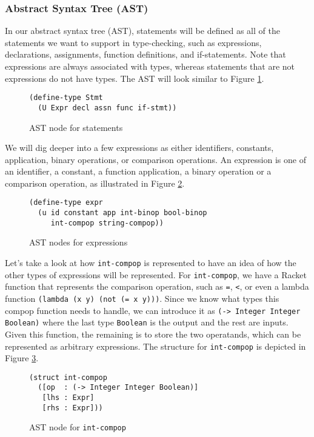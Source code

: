 \subsubsection{Abstract Syntax Tree (AST)}
In our abstract syntax tree (AST), statements will be defined as all of the statements we want to support in type-checking, such as expressions, declarations, assignments, function definitions, and if-statements. Note that expressions are always associated with types, whereas statements that are not expressions do not have types. The AST will look similar to Figure \ref{fig:ast-stmt}.

\begin{figure}[h]
    \begin{lstlisting}[language=racket]
(define-type Stmt
  (U Expr decl assn func if-stmt))
    \end{lstlisting}
    \caption[]{AST node for statements}
    \label{fig:ast-stmt}
\end{figure}

We will dig deeper into a few expressions as either identifiers, constants, application, binary operations, or comparison operations. An expression is one of an identifier, a constant, a function application, a binary operation or a comparison operation, as illustrated in Figure \ref{fig:ast-expr}.

\begin{figure}[h]
    \begin{lstlisting}[language=racket]
(define-type expr
  (u id constant app int-binop bool-binop
     int-compop string-compop))
    \end{lstlisting}
    \caption[]{AST nodes for expressions}
    \label{fig:ast-expr}
\end{figure}

Let's take a look at how {\tt int-compop} is represented to have an idea of how the other types of expressions will be represented. For {\tt int-compop}, we have a Racket function that represents the comparison operation, such as {\tt =}, {\tt <}, or even a lambda function {\tt (lambda (x y) (not (= x y)))}. Since we know what types this compop function needs to handle, we can introduce it as {\tt (-> Integer Integer Boolean)} where the last type {\tt Boolean} is the output and the rest are inputs. Given this function, the remaining is to store the two operatands, which can be represented as arbitrary expressions. The structure for {\tt int-compop} is depicted in Figure \ref{fig:ast-compop}.

\begin{figure}[h]
    \begin{lstlisting}[language=racket]
(struct int-compop
  ([op  : (-> Integer Integer Boolean)]
   [lhs : Expr]
   [rhs : Expr]))
    \end{lstlisting}
    \caption[]{AST node for {\tt int-compop}}
    \label{fig:ast-compop}
\end{figure}

